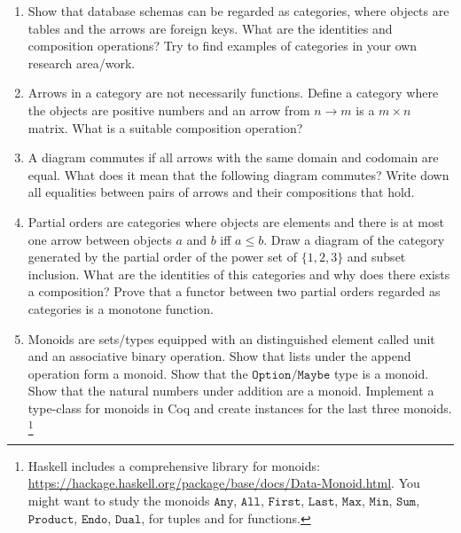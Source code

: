 \documentclass{scrartcl}
\begin{document}
\begin{enumerate}

\item
  Show that database schemas can be regarded as categories, where objects are tables and the arrows are foreign keys.
  What are the identities and composition operations?
  Try to find examples of categories in your own research area/work.

\item \label{ex:matrix}
  Arrows in a category are not necessarily functions.
  Define a category where the objects are positive numbers and an arrow from $n \rightarrow m$ is a $m \times n$ matrix.
  What is a suitable composition operation?

\item
  A diagram commutes if all arrows with the same domain and codomain are equal.
  What does it mean that the following diagram commutes?
  Write down all equalities between pairs of arrows and their compositions that hold.
  \begin{center}
  \end{center}

\item
  Partial orders are categories where objects are elements and there is at most one arrow between objects $a$ and $b$ iff $a \leq b$.
  Draw a diagram of the category generated by the partial order of the power set of $\{1,2,3\}$ and subset inclusion.
  What are the identities of this categories and why does there exists a composition?
  Prove that a functor between two partial orders regarded as categories is a monotone function.

\item
  Monoids are sets/types equipped with an distinguished element called unit and an associative binary operation.
  Show that lists under the append operation form a monoid.
  Show that the $\mathtt{Option}/\mathtt{Maybe}$ type is a monoid.
  Show that the natural numbers under addition are a monoid.
  Implement a type-class for monoids in Coq and create instances for the last three monoids.
  \footnote{Haskell includes a comprehensive library for monoids:
    \url{https://hackage.haskell.org/package/base/docs/Data-Monoid.html}.
    You might want to study the monoids $\mathtt{Any}$, $\mathtt{All}$, $\mathtt{First}$, $\mathtt{Last}$, $\mathtt{Max}$, $\mathtt{Min}$, $\mathtt{Sum}$, $\mathtt{Product}$,  $\mathtt{Endo}$, $\mathtt{Dual}$, for tuples and for functions.}


\end{enumerate}
\end{document}
